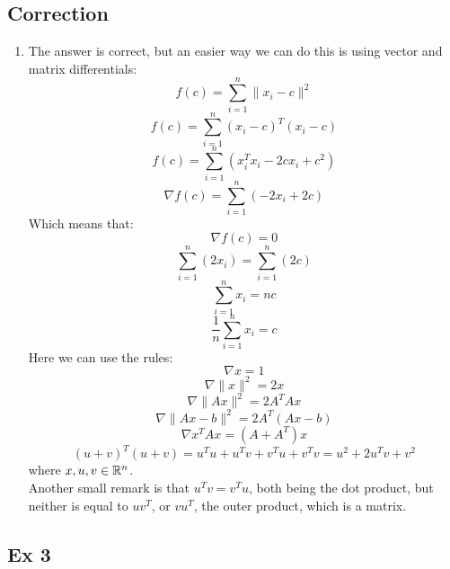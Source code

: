 \documentclass[12pt]{article}
\begin{document}
    \subsection*{Correction}
    \begin{enumerate}[label=\alph*)]
        \item
        The answer is correct,
        but an easier way we can do this is using
        vector and matrix differentials:
        \[ f(c) = \sum_{i=1}^{n}\|x_i - c\|^2 \]
        \[ f(c) = \sum_{i=1}^{n}(x_i - c)^T(x_i - c) \]
        \[ f(c) = \sum_{i=1}^{n}(x_i^Tx_i - 2cx_i + c^2) \]
        \[ \nabla f(c) 
        = \sum_{i=1}^{n}(- 2x_i + 2c) \]
        Which means that:
        \[ \nabla f(c) = 0 \]
        \[ \sum_{i=1}^{n}(2x_i) = \sum_{i=1}^{n}(2c) \]
        \[ \sum_{i=1}^{n}x_i = nc \]
        \[ \dfrac{1}{n}\sum_{i=1}^{n}x_i = c \]
        Here we can use the rules:
        \[ \nabla x = 1 \]
        \[ \nabla \| x \|^2 = 2x \]
        \[ \nabla \| Ax \|^2 = 2A^TAx \]
        \[ \nabla \| Ax -b \|^2 = 2A^T(Ax-b) \]
        \[ \nabla x^TAx = (A + A^T)x \]
        \[ (u + v)^T(u + v) 
        = u^Tu + u^Tv + v^Tu + v^Tv 
        = u^2 + 2u^Tv + v^2 \]
        where $x, u, v \in \mathbb{R}^n$. \\
        Another small remark is that $u^Tv = v^Tu$,
        both being the dot product,
        but neither is equal to $uv^T$,
        or $vu^T$,
        the outer product, which is a matrix.
    \end{enumerate}
    \endgroup

    \newpage

    \subsection*{Ex 3}
\end{document}
